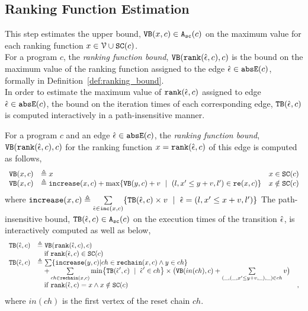   \subsection{Ranking Function Estimation}
  This step estimates the upper bound, ${\mathtt{VB}}(x, c) \in {\ensuremath{\mathtt{A_{sc}}}}(c)$
  on the maximum value for each ranking function  $x \in  \mathcal{V} \cup \mathtt{SC}(c)$.
  \\
  For a program $c$, the \emph{ranking function bound},
  ${\mathtt{VB}}(\mathtt{rank}(\hat{\mathtt{\epsilon}{}}, c), c)$ is 
  the bound on the maximum value of the ranking function  
  assigned to the edge $\hat{\mathtt{\epsilon}{}} \in \mathtt{abs}{\mathtt{E}}(c)$, formally in Definition~\ref{def:ranking_bound}.
  \\
  In order to estimate the maximum value of $\mathtt{rank}(\hat{\mathtt{\epsilon}{}}, c)$ assigned to edge $\hat{\mathtt{\epsilon}{}} \in \mathtt{abs}{\mathtt{E}}(c)$,
  the bound on the iteration times of each corresponding edge, ${\mathtt{TB}}(\hat{\mathtt{\epsilon}{}}, c)$ 
  is computed interactively in a path-insensitive manner.
  \begin{defn}
    \label{def:ranking_bound}
  For a program $c$ and an edge $\hat{\mathtt{\epsilon}{}} \in \mathtt{abs}{\mathtt{E}}(c)$,
  the \emph{ranking function bound}, 
  ${\mathtt{VB}}(\mathtt{rank}(\hat{\mathtt{\epsilon}{}}, c), c)$ for the ranking function $x = \mathtt{rank}(\hat{\mathtt{\epsilon}{}}, c)$
  of this edge
  is computed as follows,
    \[ 
  \begin{array}{lll}
    \varinvar(x, c) & \triangleq x & x \in \scvar(c) \\
    \varinvar(x, c) & \triangleq \incrs(x, c) + \max\left\{\varinvar(y, c) + v ~\mid~ (l, x' \leq y + v, l') \in \reset(x, c) \right\} & x \notin \scvar(c)
  \end{array}
  \]
  where $\mathtt{increase}(x, c) \triangleq \sum\limits_{\hat{\mathtt{\epsilon}{}} \in \mathtt{inc}(x, c)}\{{\mathtt{TB}}(\hat{\mathtt{\epsilon}{}}, c) \times v ~\mid~ \hat{\mathtt{\epsilon}{}} = (l, x' \leq x + v, l')\}$
  The path-insensitive bound, ${\mathtt{TB}}(\hat{\mathtt{\epsilon}{}}, c) \in {\ensuremath{\mathtt{A_{sc}}}}(c)$  on the execution times of the transition $\hat{\mathtt{\epsilon}{}}$, is interactively computed as well as below,
\[ 
\begin{array}{lll}
  \absclr(\absevent, c) 
  & \triangleq \varinvar(\locbound(\absevent, c), c)  &  \\
  & \quad \text{if} ~ \locbound(\absevent, c) \in \scvar(c) & \\
  \absclr(\absevent, c) 
  & \triangleq
    \sum \left\{ \incrs(y, c) | ch \in \resetchain(x, c) \land y \in ch \right\} & \\
    & \quad + 
  \sum\limits_{ch \in \resetchain(x, c)}
  \min \left\{\absclr(\absevent', c) ~\mid~ \absevent' \in ch\right\} \times 
  \big(\varinvar(in(ch), c) 
  + \sum\limits_{(\_, (\_, x' \leq y + v, \_), \_) \in ch} v \big) & \\
  &  \quad \text{if} ~\locbound(\absevent, c) = x \land x \notin \scvar(c) & ,
\end{array}
  \]
 where $in(ch)$ is the first vertex of the reset chain $ch$.
\end{defn}
